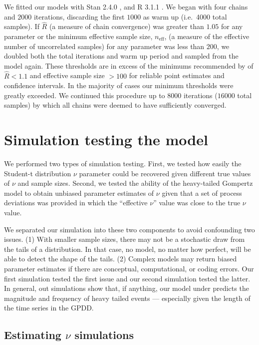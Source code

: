 We fitted our models with Stan 2.4.0 \citep{stan-manual2014}, and R 3.1.1
\citep{r2014}. We began with four chains and $2000$ iterations, discarding the
first $1000$ as warm up (i.e.~4000 total samples). If $\hat{R}$ (a measure of
chain convergence) was greater than $1.05$ for any parameter or the minimum
effective sample size, $n_\mathrm{eff}$, (a measure of the effective number of
uncorrelated samples) for any parameter was less than $200$, we doubled both the
total iterations and warm up period and sampled from the model again. These
thresholds are in excess of the minimums recommended by \citet{gelman2006a} of
$\hat{R} < 1.1$ and effective sample size $> 100$ for reliable point estimates
and confidence intervals. In the majority of cases our minimum thresholds were
greatly exceeded. We continued this procedure up to $8000$ iterations ($16000$
total samples) by which all chains were deemed to have sufficiently converged.

\section{Simulation testing the model}

We performed two types of simulation testing. First, we tested how easily the
Student-t distribution $\nu$ parameter could be recovered given different true
values of $\nu$ and sample sizes. Second, we tested the ability of the
heavy-tailed Gompertz model to obtain unbiased parameter estimates of $\nu$
given that a set of process deviations was provided in which the ``effective
$\nu$'' value was close to the true $\nu$ value.

We separated our simulation into these two components to avoid confounding two
issues. (1) With smaller sample sizes, there may not be a stochastic draw from
the tails of a distribution. In that case, no model, no matter how perfect,
will be able to detect the shape of the tails. (2) Complex models may return
biased parameter estimates if there are conceptual, computational, or coding
errors. Our first simulation tested the first issue and our second simulation
tested the latter. In general, out simulations show that, if anything, our
model under predicts the magnitude and frequency of heavy tailed events ---
especially given the length of the time series in the GPDD.

\subsection{Estimating $\nu$ simulations}

